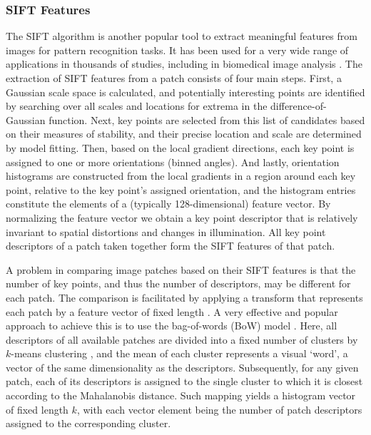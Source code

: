 \subsubsection{SIFT Features}
\label{subsubsec:sift-and-bow}

The SIFT algorithm \citep{lowe2004distinctive} is another popular tool to extract meaningful features from images for pattern recognition tasks. It has been used for a very wide range of applications in thousands of studies, including in biomedical image analysis \citep{DBLP:journals/cmig/NiCQYQWHH09, Jiang-2010, Mualla-2013, DBLP:journals/cmmm/ZhangZLYX13, 10.1371/journal.pone.0153043, 7182310}. The extraction of SIFT features from a patch consists of four main steps. First, a Gaussian scale space is calculated, and potentially interesting points are identified by searching over all scales and locations for extrema in the difference-of-Gaussian function. Next, key points are selected from this list of candidates based on their measures of stability, and their precise location and scale are determined by model fitting. Then, based on the local gradient directions, each key point is assigned to one or more orientations (binned angles). And lastly, orientation histograms are constructed from the local gradients in a region around each key point, relative to the key point's assigned orientation, and the histogram entries constitute the elements of a (typically 128-dimensional) feature vector. By normalizing the feature vector we obtain a key point descriptor that is relatively invariant to spatial distortions and changes in illumination. All key point descriptors of a patch taken together form the SIFT features of that patch.

A problem in comparing image patches based on their SIFT features is that the number of key points, and thus the number of descriptors, may be different for each patch. The comparison is facilitated by applying a transform that represents each patch by a feature vector of fixed length {\color{red}\citep{Yang}}. A very effective and popular approach to achieve this is to use the bag-of-words (BoW) model {\color{red}\citep{FeiFei}}. Here, all descriptors of all available patches are divided into a fixed number of clusters by $k$-means clustering \citep{macqueen1967}, and the mean of each cluster represents a visual `word', a vector of the same dimensionality as the descriptors. Subsequently, for any given patch, each of its descriptors is assigned to the {\color{red}single} cluster to which it is closest according to the Mahalanobis distance. {\color{red}Such mapping yields a histogram} vector of fixed length $k$, with each vector element being the number of patch descriptors assigned to the corresponding cluster.

